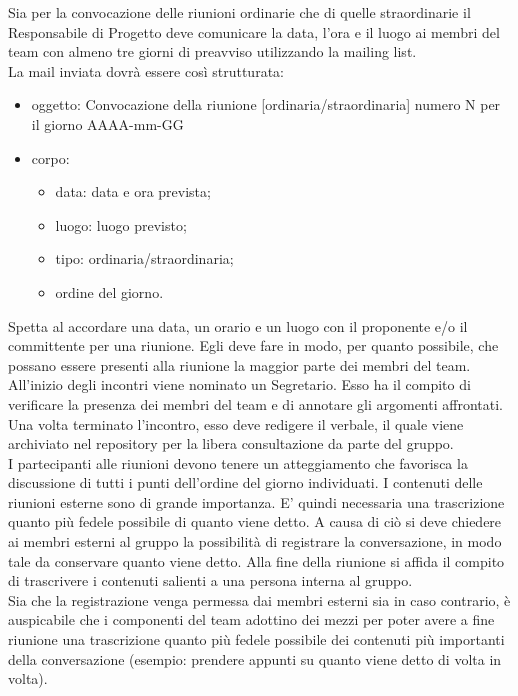 					Sia per la convocazione delle riunioni ordinarie che di quelle straordinarie il Responsabile di Progetto deve comunicare la data, l'ora e il luogo ai membri del team con almeno tre giorni di preavviso utilizzando la mailing list.\\
					La mail inviata dovrà essere così strutturata:
					\begin{itemize}
						\item oggetto: Convocazione della riunione [ordinaria/straordinaria] numero N per il giorno AAAA-mm-GG
						\item corpo:
						\begin{itemize}
							\item data: data e ora prevista;
							\item luogo: luogo previsto;
							\item tipo: ordinaria/straordinaria;
							\item ordine del giorno.
						\end{itemize}
					\end{itemize}
					Spetta al  accordare una data, un orario e un luogo con il proponente e/o il committente per una riunione. Egli deve fare in modo, per quanto possibile, che possano essere presenti alla riunione la maggior parte dei membri del team.
					All'inizio degli incontri viene nominato un Segretario. Esso ha il compito di verificare la presenza dei membri del team e di annotare gli argomenti affrontati. Una volta terminato l'incontro, esso deve redigere il verbale, il quale viene archiviato nel repository per la libera consultazione da parte del gruppo.\\
					I partecipanti alle riunioni devono tenere un atteggiamento che favorisca la discussione di tutti i punti dell'ordine del giorno individuati.
					I contenuti delle riunioni esterne sono di grande importanza. E' quindi necessaria una trascrizione quanto più fedele possibile di quanto viene detto. A causa di ciò si deve chiedere ai membri esterni al gruppo la possibilità di registrare la conversazione, in modo tale da conservare quanto viene detto. Alla fine della riunione si affida il compito di trascrivere i contenuti salienti a una persona interna al gruppo.\\
					Sia che la registrazione venga permessa dai membri esterni sia in caso contrario, è auspicabile che i componenti del team adottino dei mezzi per poter avere a fine riunione una trascrizione quanto più fedele possibile dei contenuti più importanti della conversazione (esempio: prendere appunti su quanto viene detto di volta in volta).

